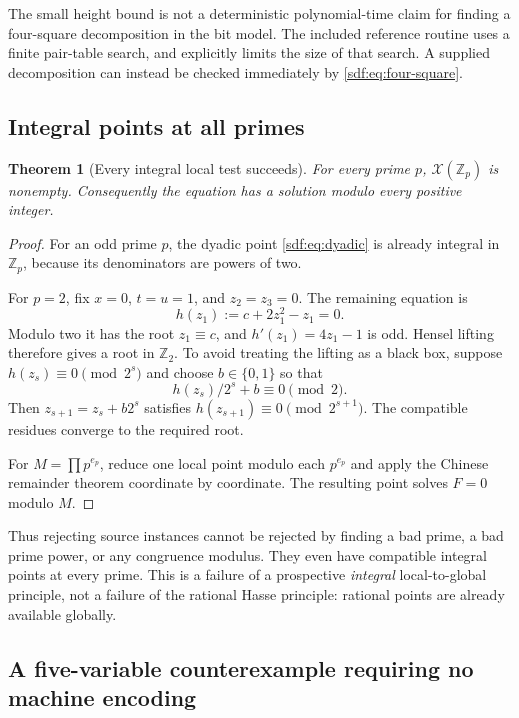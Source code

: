 \documentclass[11pt,a4paper]{article}
\newtheorem{theorem}{Theorem}[section]
\theoremstyle{definition}
\theoremstyle{remark}
\newcommand{\Z}{\mathbb Z}
\newcommand{\variety}{\mathcal X}
\begin{document}
The small height bound is not a deterministic polynomial-time claim for
finding a four-square decomposition in the bit model. The included reference
routine uses a finite pair-table search, and explicitly limits the size of
that search. A supplied decomposition can instead be checked immediately
by \eqref{sdf:eq:four-square}.

\subsection{Integral points at all primes}

\begin{theorem}[Every integral local test succeeds]\label{sdf:thm:local}
For every prime $p$, $\variety(\Z_p)$ is nonempty. Consequently the equation
has a solution modulo every positive integer.
\end{theorem}
\begin{proof}
For an odd prime $p$, the dyadic point \eqref{sdf:eq:dyadic} is already integral
in $\Z_p$, because its denominators are powers of two.

For $p=2$, fix $x=0$, $t=u=1$, and $z_2=z_3=0$. The remaining equation
is
\begin{equation}\label{sdf:eq:2adic}
 h(z_1):=c+2z_1^2-z_1=0.
\end{equation}
Modulo two it has the root $z_1\equiv c$, and $h'(z_1)=4z_1-1$ is odd.
Hensel lifting therefore gives a root in $\Z_2$. To avoid treating the
lifting as a black box, suppose $h(z_s)\equiv0\pmod{2^s}$ and choose
$b\in\{0,1\}$ so that
\[
 h(z_s)/2^s+b\equiv0\pmod2.
\]
Then $z_{s+1}=z_s+b2^s$ satisfies
$h(z_{s+1})\equiv0\pmod{2^{s+1}}$. The compatible residues converge to the
required root.

For $M=\prod p^{e_p}$, reduce one local point modulo each $p^{e_p}$ and
apply the Chinese remainder theorem coordinate by coordinate. The resulting
point solves $F=0$ modulo $M$.
\end{proof}

Thus rejecting source instances cannot be rejected by finding a bad prime,
a bad prime power, or any congruence modulus. They even have compatible
integral points at every prime. This is a failure of a prospective
\emph{integral} local-to-global principle, not a failure of the rational
Hasse principle: rational points are already available globally.

\subsection{A five-variable counterexample requiring no machine encoding}
\end{document}
